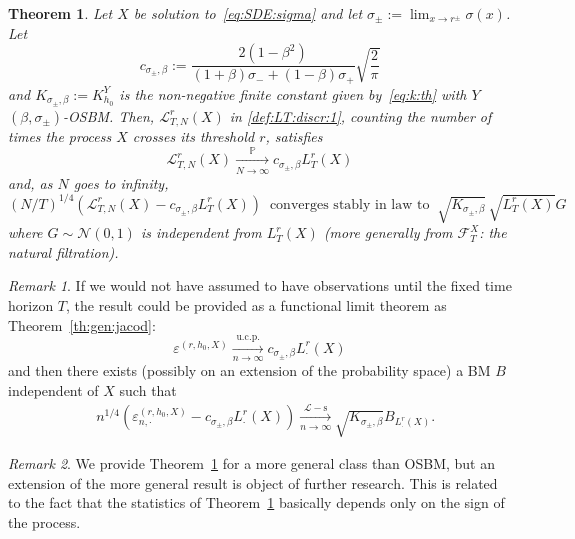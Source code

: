 \documentclass[12pt]{article}
\numberwithin{equation}{section}
\newtheorem{theorem}{Theorem}
\theoremstyle{definition}
\theoremstyle{remark}
\newtheorem{remark}{Remark}
\newcommand{\convp}[1][]{\xrightarrow[#1]{\PP}}
\newcommand{\convsl}[1][]{\xrightarrow[#1]{\mathcal{L}-\mathrm{s}}}
\newcommand{\convucp}[1][]{\xrightarrow[#1]{\mathrm{u.c.p.}}}
\newcommand{\PP}{\mathbb{P}}
\begin{document}
\begin{theorem} \label{th:crossings}
Let $X$ be solution to~\eqref{eq:SDE:sigma} and let  $\sigma_\pm := \lim_{x\to r^\pm} \sigma(x)$. Let 
\begin{equation} 
	c_{\sigma_\pm,\beta} := \frac{2 (1-\beta^2)}{(1+\beta) \sigma_-+ (1-\beta) \sigma_+} \sqrt{\frac2\pi}  
\end{equation}
and $K_{\sigma_\pm,\beta}:=K^Y_{h_0}$ is the non-negative finite constant given by~\eqref{eq:k:th} with $Y$ $(\beta,\sigma_\pm)$-OSBM.
%
Then, 
$\mathcal{L}^r_{T,N}(X)$ in \eqref{def:LT:discr:1}, counting the number of times the process $X$ crosses its threshold $r$, satisfies
\begin{equation} 
	\mathcal{L}^r_{T,N}(X)  \convp[N\to\infty] c_{\sigma_\pm,\beta} L_T^r(X) 
\end{equation}
and, as $N$ goes to infinity,
\begin{equation} \label{eq:crossings_T}
	(N/T)^{1/4} \left( \mathcal{L}^r_{T,N}(X) - c_{\sigma_\pm,\beta} L^r_T(X)\right)  \ \text{ converges stably in law to } \ \sqrt{K_{\sigma_\pm,\beta}} \, \sqrt{L^r_{T}(X)} G %
\end{equation} 
where $G\sim \mathcal N(0,1)$ is independent from $L^r_T(X)$ (more generally from $\mathcal F_T^X$: the natural filtration). 
\end{theorem}


\begin{remark}
If we would not have assumed to have observations until the fixed time horizon $T$, the result could be provided as a functional limit theorem as Theorem~\ref{th:gen:jacod}:
\[\varepsilon^{(r,h_0,X)} \convucp[n\to\infty]  c_{\sigma_\pm,\beta} L^r_{\cdot}(X) \]
and then there exists (possibly on an extension of the probability space) a BM $B$ independent of $X$ such that
\[
\begin{split}
	& n^{1/4} 
	\left(  \varepsilon_{n,\cdot}^{(r,h_0,X)} -  c_{\sigma_\pm,\beta} L^r_\cdot(X)\right)
	\convsl[n\to\infty]
\sqrt{K_{\sigma_\pm,\beta}} B_{L^r_\cdot(X)}.
\end{split} 
\]
\end{remark}



\begin{remark}
We provide Theorem~\ref{th:crossings} for a more general class than OSBM, but an extension of the more general result is object of further research. This is related to the fact that the statistics of Theorem~\ref{th:crossings} basically depends only on the sign of the process.
\end{remark}
\end{document}

